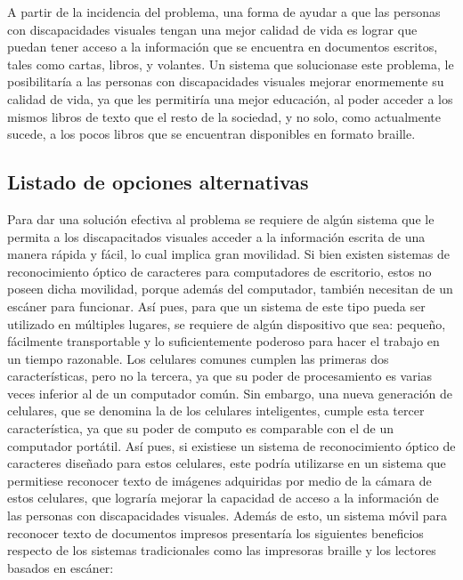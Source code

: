 \documentclass[a4paper, 12pt, oneside]{article}
\begin{document}
A partir de la incidencia del problema, una forma de ayudar a que las personas con discapacidades visuales tengan una mejor calidad de vida es lograr que puedan tener acceso a la información que se encuentra en documentos escritos, tales como cartas, libros, y volantes. Un sistema que solucionase este problema, le posibilitaría a las personas con discapacidades visuales mejorar enormemente su calidad de vida, ya que les permitiría una mejor educación, al poder acceder a los mismos libros de texto que el resto de la sociedad, y no solo, como actualmente sucede, a los pocos libros que se encuentran disponibles en formato braille.


\clearpage

	\begin{center}
	\section{Listado de opciones alternativas}
	\end{center}

Para dar una solución efectiva al problema se requiere de algún sistema que le permita a los discapacitados visuales acceder a la información escrita de una manera rápida y fácil, lo cual implica gran movilidad. Si bien existen sistemas de reconocimiento óptico de caracteres para computadores de escritorio, estos no poseen dicha movilidad, porque además del computador, también necesitan de un escáner para funcionar. Así pues, para que un sistema de este tipo pueda ser utilizado en múltiples lugares, se requiere de algún dispositivo que sea: pequeño, fácilmente transportable y lo suficientemente poderoso para hacer el trabajo en un tiempo razonable. Los celulares comunes cumplen las primeras dos características, pero no la tercera, ya que su poder de procesamiento es varias veces inferior al de un computador común. Sin embargo, una nueva generación de celulares, que se denomina la de los celulares inteligentes, cumple esta tercer característica, ya que su poder de computo es comparable con el de un computador portátil. Así pues, si existiese un sistema de reconocimiento óptico de caracteres diseñado para estos celulares, este podría utilizarse en un sistema que permitiese reconocer texto de imágenes adquiridas por medio de la cámara de estos celulares, que lograría mejorar la capacidad de acceso a la información de las personas con discapacidades visuales. Además de esto, un sistema móvil para reconocer texto de documentos impresos presentaría los siguientes beneficios respecto de los sistemas tradicionales como las impresoras braille y los lectores basados en escáner:
\end{document}
